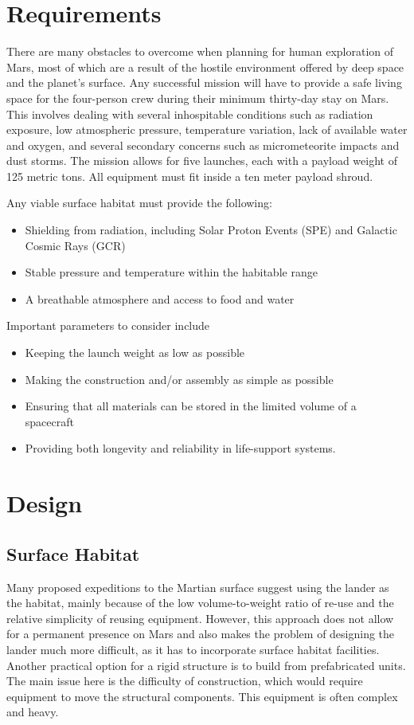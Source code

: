 \documentclass[12pt,letterpaper,oneside,twocolumn]{article}
\begin{document}
\section{Requirements}
There are many obstacles to overcome when planning for human exploration of Mars, most of which are a result of the hostile environment offered by deep space and the planet’s surface. Any successful mission will have to provide a safe living space for the four-person crew during their minimum thirty-day stay on Mars. This involves dealing with several inhospitable conditions such as radiation exposure, low atmospheric pressure, temperature variation, lack of available water and oxygen, and several secondary concerns such as micrometeorite impacts and dust storms. The mission allows for five launches, each with a payload weight of 125 metric tons. All equipment must fit inside a ten meter payload shroud.

Any viable surface habitat must provide the following:
\begin{itemize}
  \item Shielding from radiation, including Solar Proton Events (SPE) and Galactic Cosmic Rays (GCR)
  \item Stable pressure and temperature within the habitable range
  \item A breathable atmosphere and access to food and water
\end{itemize}


Important parameters to consider include
\begin{itemize}
  \item Keeping the launch weight as low as possible
  \item Making the construction and/or assembly as simple as possible
  \item Ensuring that all materials can be stored in the limited volume of a spacecraft
  \item Providing both longevity and reliability in life-support systems.
\end{itemize}

\section{Design}
\subsection{Surface Habitat}
Many proposed expeditions to the Martian surface suggest using the lander as the habitat, mainly because of the low volume-to-weight ratio of re-use and the relative simplicity of reusing equipment. However, this approach does not allow for a permanent presence on Mars and also makes the problem of designing the lander much more difficult, as it has to incorporate surface habitat facilities. Another practical option for a rigid structure is to build from prefabricated units. The main issue here is the difficulty of construction, which would require equipment to move the structural components.  This equipment is often complex and heavy.
\end{document}
